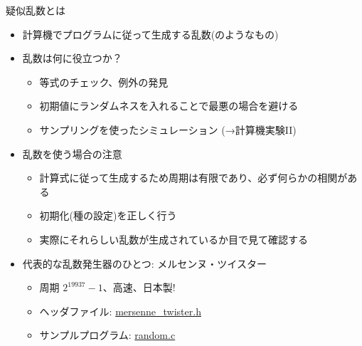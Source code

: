 \begin{frame}[t,fragile]{疑似乱数とは}
  \begin{itemize}
  \item 計算機でプログラムに従って生成する乱数(のようなもの)
  \item 乱数は何に役立つか？
    \begin{itemize}
    \item 等式のチェック、例外の発見
    \item 初期値にランダムネスを入れることで最悪の場合を避ける
    \item サンプリングを使ったシミュレーション (→計算機実験II)
    \end{itemize}
  \item 乱数を使う場合の注意
    \begin{itemize}
    \item 計算式に従って生成するため周期は有限であり、必ず何らかの相関がある
    \item 初期化(種の設定)を正しく行う
    \item 実際にそれらしい乱数が生成されているか目で見て確認する
    \end{itemize}
  \item 代表的な乱数発生器のひとつ: メルセンヌ・ツイスター
    \begin{itemize}
    \item 周期 $2^{19937}-1$、高速、日本製!
    \item ヘッダファイル: \href{https://github.com/todo-group/computer-experiments/blob/master/exercise/monte_carlo/mersenne_twister.h}{mersenne\_twister.h}
    \item サンプルプログラム: \href{https://github.com/todo-group/computer-experiments/blob/master/exercise/monte_carlo/random.c}{random.c}
    \end{itemize}
  \end{itemize}
\end{frame}
